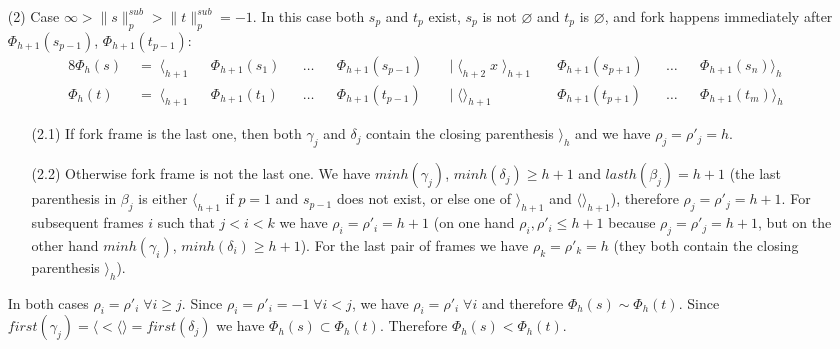 \documentclass[AMA,STIX1COL]{WileyNJD-v2}
\newcommand{\Xl}{\langle}
\newcommand{\Xr}{\rangle}
\newcommand{\Xm}{\langle\!\rangle}
\newcommand{\snorm}[2]{\|{#1}\|^{sub}_{#2}}
\begin{document}
\begin{proofEnd}
\begin{itemize}[itemsep=0.5em, topsep=0.5em]
    \item[(2)]
        Case $\infty > \snorm{s}{p} > \snorm{t}{p} = -1$.
        In this case both $s_p$ and $t_p$ exist,
        $s_p$ is not $\varnothing$ and $t_p$ is $\varnothing$,
        and fork happens immediately after $\Phi_{h+1}(s_{p-1})$, $\Phi_{h+1}(t_{p-1})$:
        \begin{alignat*}{8}
            \Phi_{h}(s) &\;=\; \Xl_{h+1} &&\Phi_{h+1}(s_1) &&\dots &&\Phi_{h+1}(s_{p-1})
                &&\;\big|\; \Xl_{h+2} \; x \; \Xr_{h+1} \; &&\Phi_{h+1}(s_{p+1}) &&\dots &&\Phi_{h+1}(s_n) \Xr_{h} \\[-0.5em]
            \Phi_{h}(t) &\;=\; \Xl_{h+1} &&\Phi_{h+1}(t_1) &&\dots &&\Phi_{h+1}(t_{p-1})
                &&\;\big|\; \Xm_{h+1} \;\;\;\;\;\;         &&\Phi_{h+1}(t_{p+1}) &&\dots &&\Phi_{h+1}(t_m) \Xr_{h}
        \end{alignat*}
        \begin{itemize}
        \item[(2.1)]
            If fork frame is the last one,
            then both $\gamma_j$ and $\delta_j$ contain the closing parenthesis $\Xr_{h}$
            and we have $\rho_j = \rho'_j = h$.

        \item[(2.2)]
            Otherwise fork frame is not the last one.
            We have $minh(\gamma_j)$, $minh(\delta_j) \geq h + 1$
            and $lasth (\beta_j) = h + 1$
            (the last parenthesis in $\beta_j$ is either $\Xl_{h+1}$ if $p = 1$ and $s_{p-1}$ does not exist,
            or else one of $\Xr_{h+1}$ and $\Xm_{h+1}$),
            therefore $\rho_j = \rho'_j = h + 1$.
            For subsequent frames $i$ such that $j < i < k$ we have $\rho_i = \rho'_i = h + 1$
            (on one hand $\rho_i, \rho'_i \leq h + 1$ because $\rho_j = \rho'_j = h + 1$,
            but on the other hand $minh(\gamma_i)$, $minh(\delta_i) \geq h + 1$).
            For the last pair of frames we have $\rho_k = \rho'_k = h$ (they both contain the closing parenthesis $\Xr_{h}$).
        \end{itemize}

        In both cases $\rho_i = \rho'_i \;\forall i \geq j$.
        Since $\rho_i = \rho'_i = -1 \;\forall i < j$,
        we have $\rho_i = \rho'_i \;\forall i$ and therefore $\Phi_{h}(s) \sim \Phi_{h}(t)$.
        Since $first (\gamma_j) = \Xl < \Xm = first (\delta_j)$ we have $\Phi_{h}(s) \subset \Phi_{h}(t)$.
        Therefore $\Phi_{h}(s) < \Phi_{h}(t)$.


\end{itemize}
\end{proofEnd}
\end{document}
